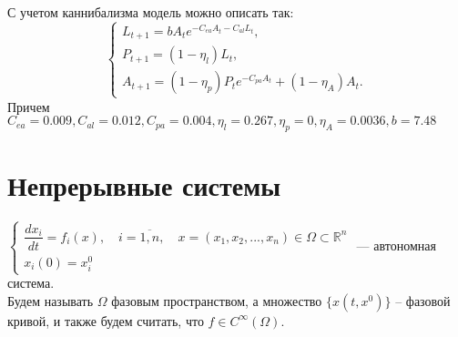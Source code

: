 С учетом каннибализма модель можно  описать так:
$$
\begin{cases}
L_{t+1}=bA_te^{-C_{ea}A_t-C_{al}L_t},  \\
P_{t+1}=(1-\eta_l)L_t,\\
A_{t+1}=(1-\eta_p)P_t e^{-C_{pa}A_t} + (1-\eta_A)A_t. 
\end{cases}
$$
Причем $C_{ea}=0.009,C_{al}=0.012,C_{pa}=0.004,\eta_l=0.267,\eta_p=0,\eta_A=0.0036,b=7.48$
\section{Непрерывные системы}
$
\begin{cases}
\dfrac{dx_i}{dt}=f_i(x),\quad i=\overline{1,n},\quad x=(x_1,x_2,...,x_n)\in\Omega\subset\mathbb{R}^n\\
x_i(0)=x_i^0
\end{cases}$ --- автономная система.\\

Будем называть $\Omega$  фазовым пространством, а множество $\{x(t,x^0)\}$ -- фазовой кривой, и также будем считать, что $f\in C^{\infty}(\Omega)$.  
